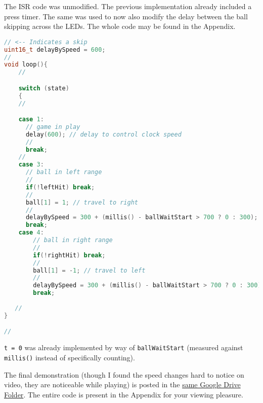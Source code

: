 
\begin{arabicparts}
    \questionpart The ISR code was unmodified. The previous implementation
    already included a press timer. The same was used to now also modify the
    delay between the ball skipping across the LEDs. The whole code may be found
    in the Appendix.

    \begin{lstlisting}[language=C++]
// <-- Indicates a skip
uint16_t delayBySpeed = 600;
//
void loop(){
    //

    switch (state)
    {
    //

    case 1:
      // game in play
      delay(600); // delay to control clock speed
      //
      break;
    //
    case 3:
      // ball in left range
      //
      if(!leftHit) break;
      //
      ball[1] = 1; // travel to right
      //
      delayBySpeed = 300 + (millis() - ballWaitStart > 700 ? 0 : 300);
      break;
    case 4:
        // ball in right range
        //
        if(!rightHit) break;
        //
        ball[1] = -1; // travel to left
        //
        delayBySpeed = 300 + (millis() - ballWaitStart > 700 ? 0 : 300);
        break;
    
   //
}

//
    \end{lstlisting}

    \questionpart \texttt{t = 0} was already implemented by way of
    \texttt{ballWaitStart} (measured against \texttt{millis()} instead of
    specifically counting).

    \questionpart The final demonstration (though I found the speed changes hard
    to notice on video, they are noticeable while playing) is posted in the
    \href{https://drive.google.com/drive/folders/1oetbbPwgUUYHVBNe5_pIktCHrrqsNl7a?usp=sharing}{same
    Google Drive Folder}. The entire code is present in the Appendix for your
    viewing pleasure.

\end{arabicparts}